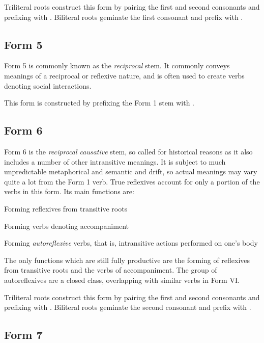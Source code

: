 \documentclass[grammar]{subfiles}
\begin{document}
  Triliteral roots construct this form by pairing the first and second consonants and prefixing with .
  Biliteral roots geminate the first consonant and prefix with .

  \subsection{Form 5}
  \label{ssec:dev_verb_form_5}

  Form 5 is commonly known as the \emph{reciprocal} stem. 
  It commonly conveys meanings of a reciprocal or reflexive nature, and is often used to create verbs denoting social interactions.

  This form is constructed by prefixing the Form 1 stem with .

  \subsection{Form 6}
  \label{ssec:dev_verb_form_6}

  Form 6 is the \emph{reciprocal causative} stem, so called for historical reasons as it also includes a number of other intransitive meanings. 
  It is subject to much unpredictable metaphorical and semantic and drift, so actual meanings may vary quite a lot from the Form 1 verb.
  True reflexives account for only a portion of the verbs in this form. 
  Its main functions are: 

  \begin{itemize*}
    \item Forming reflexives from transitive roots
    \item Forming verbs denoting accompaniment
    \item Forming \emph{autoreflexive} verbs, that is, intransitive actions performed on one’s body
  \end{itemize*}

  The only functions which are still fully productive are the forming of reflexives from transitive roots and the verbs of accompaniment. 
  The group of autoreflexives are a closed class, overlapping with similar verbs in Form VI.

  Triliteral roots construct this form by pairing the first and second consonants and prefixing with . 
  Biliteral roots geminate the second consonant and prefix with .

  \subsection{Form 7}
  \label{ssec:dev_verb_form_7}
\end{document}
